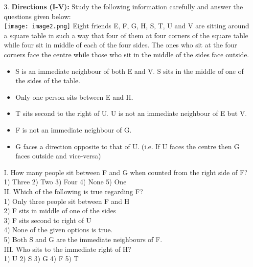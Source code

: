 \documentclass[
]{article}
\begin{document}
3. \textbf{Directions (I-V):} Study the following information carefully and answer the questions given
below:\\
\texttt{[image: image2.png]}
Eight friends E, F, G, H, S, T, U and V are sitting around a square table in such a way that
four of them at four corners of the square table while four sit in middle of each of the four
sides. The ones who sit at the four corners face the centre while those who sit in the middle
of the sides face outside.\\
\begin{itemize}
    \item S is an immediate neighbour of both E and V. S sits in the middle of one of the sides of
the table.
    \item Only one person sits between E and H.
    \item T sits second to the right of U. U is not an immediate neighbour of E but V.
    \item F is not an immediate neighbour of G.
    \item G faces a direction opposite to that of U. (i.e. If U faces the centre then G faces outside
and vice-versa)
\end{itemize}

I. How many people sit between F and G when counted from the right side of F?\\
1) Three \hspace{2mm}2) Two \hspace{2mm}3) Four \hspace{2mm}4) None \hspace{2mm}5) One\\

II. Which of the following is true regarding F?\\
1) Only three people sit between F and H\\
2) F sits in middle of one of the sides\\
3) F sits second to right of U\\
4) None of the given options is true.\\
5) Both S and G are the immediate neighbours of F.\\

III. Who sits to the immediate right of H?\\
1) U \hspace{2mm}2) S \hspace{2mm}3) G \hspace{2mm}4) F \hspace{2mm}5) T\\
\end{document}
